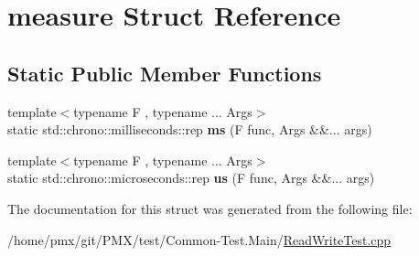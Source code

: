 \hypertarget{structmeasure}{}\section{measure Struct Reference}
\label{structmeasure}
\subsection*{Static Public Member Functions}
\begin{DoxyCompactItemize}
\item 
\mbox{\label{structmeasure_a3a7b753db056b1c02104c0a3f61ca234}} 
{\footnotesize template$<$typename F , typename ... Args$>$ }\\static std\+::chrono\+::milliseconds\+::rep {\bfseries ms} (F func, Args \&\&... args)
\item 
\mbox{\label{structmeasure_a81fe45042e6da54ed0f2cb8ebef24f5e}} 
{\footnotesize template$<$typename F , typename ... Args$>$ }\\static std\+::chrono\+::microseconds\+::rep {\bfseries us} (F func, Args \&\&... args)
\end{DoxyCompactItemize}


The documentation for this struct was generated from the following file\+:\begin{DoxyCompactItemize}
\item 
/home/pmx/git/\+P\+M\+X/test/\+Common-\/\+Test.\+Main/\hyperlink{ReadWriteTest_8cpp}{Read\+Write\+Test.\+cpp}\end{DoxyCompactItemize}
